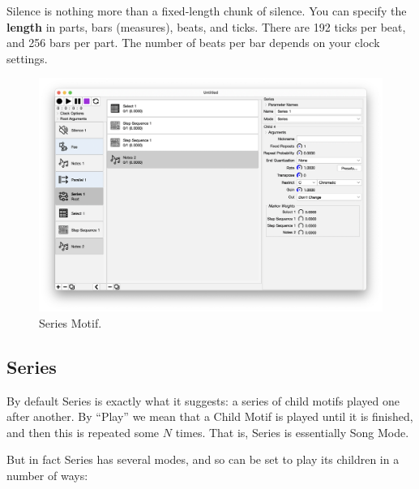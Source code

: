 \documentclass[twoside,10pt]{article}
\begin{document}
Silence is nothing more than a fixed-length chunk of silence.    You can specify the {\bf length} in parts, bars (measures), beats, and ticks.  There are 192 ticks per beat, and 256 bars per part.  The number of beats per bar depends on your clock settings.

\clearpage

\begin{figure}[t]
\centering
\includegraphics[width=6.5in]{Series}
\vspace{-2em}
\caption{Series Motif.}
\label{series}
\end{figure}

\subsection{Series}

By default Series is exactly what it suggests: a series of child motifs played one after another.   By ``Play'' we mean that a Child Motif is played until it is finished, and then this is repeated some \(N\) times.  That is, Series is essentially Song Mode.  

But in fact Series has several modes, and so can be set to play its children in a number of ways:
\end{document}
